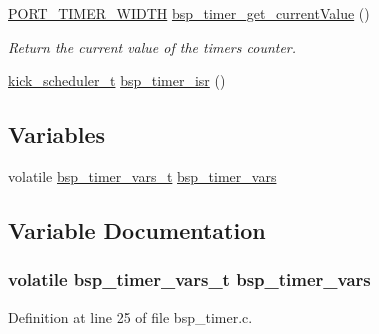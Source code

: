 \begin{DoxyCompactItemize}
\hyperlink{z1_2board__info_8h_abe66b9c1c60db84f2a99f2b827275f24}{P\+O\+R\+T\+\_\+\+T\+I\+M\+E\+R\+\_\+\+W\+I\+D\+TH} \hyperlink{group__bsp__timer_gae648940e8aa53efe781a7bbb056a9e50}{bsp\+\_\+timer\+\_\+get\+\_\+current\+Value} ()
\begin{DoxyCompactList}\small\item\em Return the current value of the timer\textquotesingle{}s counter. \end{DoxyCompactList}\item 
\hyperlink{group__board_gac9ebdcc0a4f3c8422f5f4f0fbbe0ded0}{kick\+\_\+scheduler\+\_\+t} \hyperlink{group__bsp__timer_ga1e6f08f2808b6c73ae3ee4d31346abb9}{bsp\+\_\+timer\+\_\+isr} ()
\end{DoxyCompactItemize}
\subsection*{Variables}
\begin{DoxyCompactItemize}
\item 
volatile \hyperlink{structbsp__timer__vars__t}{bsp\+\_\+timer\+\_\+vars\+\_\+t} \hyperlink{iot-lab___m3_2bsp__timer_8c_aa4dd022c85bc113e518f8d4418ffbe31}{bsp\+\_\+timer\+\_\+vars}
\end{DoxyCompactItemize}


\subsection{Variable Documentation}
\subsubsection[{\texorpdfstring{bsp\+\_\+timer\+\_\+vars}{bsp_timer_vars}}]{\setlength{\rightskip}{0pt plus 5cm}volatile {\bf bsp\+\_\+timer\+\_\+vars\+\_\+t} bsp\+\_\+timer\+\_\+vars}\hypertarget{iot-lab___m3_2bsp__timer_8c_aa4dd022c85bc113e518f8d4418ffbe31}{}\label{iot-lab___m3_2bsp__timer_8c_aa4dd022c85bc113e518f8d4418ffbe31}


Definition at line 25 of file bsp\+\_\+timer.\+c.

